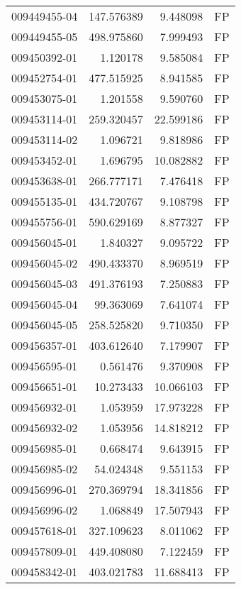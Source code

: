 \begin{tabular}{lrrl}
009449455-04 &  147.576389 &       9.448098 &   FP \\
009449455-05 &  498.975860 &       7.999493 &   FP \\
009450392-01 &    1.120178 &       9.585084 &   FP \\
009452754-01 &  477.515925 &       8.941585 &   FP \\
009453075-01 &    1.201558 &       9.590760 &   FP \\
009453114-01 &  259.320457 &      22.599186 &   FP \\
009453114-02 &    1.096721 &       9.818986 &   FP \\
009453452-01 &    1.696795 &      10.082882 &   FP \\
009453638-01 &  266.777171 &       7.476418 &   FP \\
009455135-01 &  434.720767 &       9.108798 &   FP \\
009455756-01 &  590.629169 &       8.877327 &   FP \\
009456045-01 &    1.840327 &       9.095722 &   FP \\
009456045-02 &  490.433370 &       8.969519 &   FP \\
009456045-03 &  491.376193 &       7.250883 &   FP \\
009456045-04 &   99.363069 &       7.641074 &   FP \\
009456045-05 &  258.525820 &       9.710350 &   FP \\
009456357-01 &  403.612640 &       7.179907 &   FP \\
009456595-01 &    0.561476 &       9.370908 &   FP \\
009456651-01 &   10.273433 &      10.066103 &   FP \\
009456932-01 &    1.053959 &      17.973228 &   FP \\
009456932-02 &    1.053956 &      14.818212 &   FP \\
009456985-01 &    0.668474 &       9.643915 &   FP \\
009456985-02 &   54.024348 &       9.551153 &   FP \\
009456996-01 &  270.369794 &      18.341856 &   FP \\
009456996-02 &    1.068849 &      17.507943 &   FP \\
009457618-01 &  327.109623 &       8.011062 &   FP \\
009457809-01 &  449.408080 &       7.122459 &   FP \\
009458342-01 &  403.021783 &      11.688413 &   FP \\

\end{tabular}
